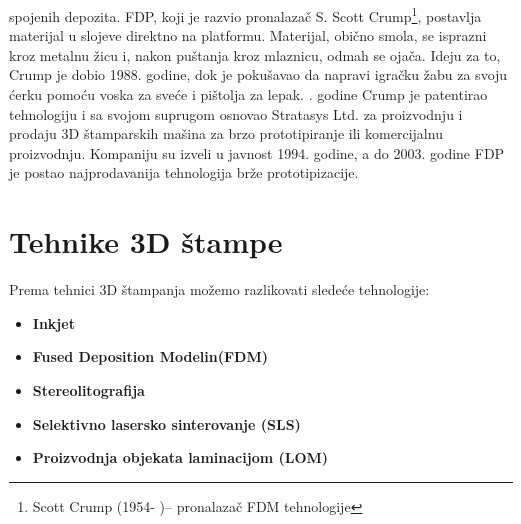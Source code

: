 \documentclass[a4paper]{article}
\begin{document}
spojenih depozita. FDP, koji je razvio pronalazač S. Scott Crump\footnote{Scott Crump
(1954- )– pronalazač FDM tehnologije}, postavlja materijal u slojeve direktno na platformu.
Materijal, obično smola, se isprazni kroz metalnu žicu i, nakon puštanja kroz mlaznicu,
odmah se ojača. Ideju za to, Crump je dobio 1988. godine, dok je pokušavao da napravi
igračku žabu za svoju ćerku pomoću voska za sveće i pištolja za lepak.
. godine Crump je patentirao tehnologiju i sa svojom suprugom osnovao
Stratasys Ltd. za proizvodnju i prodaju 3D štamparskih mašina za brzo prototipiranje ili
komercijalnu proizvodnju.
Kompaniju su izveli u javnost 1994. godine, a do 2003. godine FDP je postao
najprodavanija tehnologija brže prototipizacije.

\section{Tehnike 3D štampe\cite{c}}
\label{sec:naslov1}
Prema tehnici 3D štampanja možemo razlikovati sledeće tehnologije:
\begin{itemize}
\item \textbf{Inkjet}
\item \textbf{Fused Deposition Modelin(FDM)}
\item \textbf{Stereolitografija}
\item \textbf{Selektivno lasersko sinterovanje (SLS)}
\item \textbf{Proizvodnja objekata laminacijom (LOM)}
\end{itemize} 



 
\end{document}
